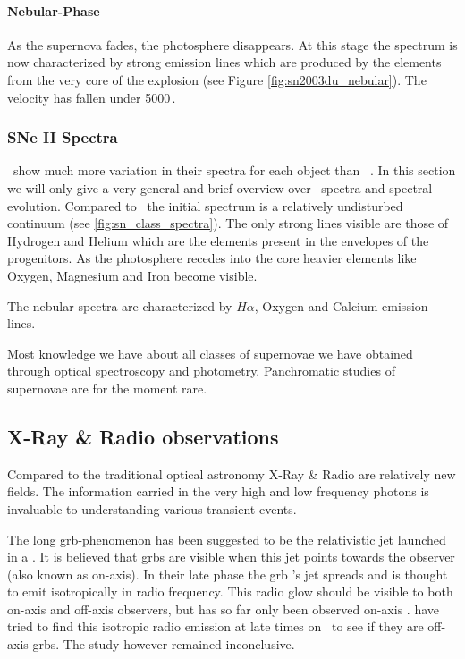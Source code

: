 \paragraph{Nebular-Phase}
As the supernova fades, the photosphere disappears. At this stage the spectrum is now characterized by strong emission lines which are produced by the elements from the very core of the explosion (see Figure \ref{fig:sn2003du_nebular}). The velocity has fallen under 5000\,\kms. 




\subsubsection{SNe II Spectra}
\sneii\ show much more variation in their spectra for each object than \sneia\ . In this section we will only give a very general and brief overview over \sneii\ spectra and spectral evolution. 
Compared to \sneia\ the initial spectrum is a relatively undisturbed continuum (see \ref{fig:sn_class_spectra}). The only strong lines visible are those of Hydrogen and Helium which are the elements present in the envelopes of the progenitors. 
As the photosphere recedes into the core heavier elements like Oxygen, Magnesium and Iron become visible. 

The nebular spectra are characterized by $H\alpha$, Oxygen and Calcium emission lines. 

Most knowledge we have about all classes of supernovae we have obtained through optical spectroscopy and photometry. Panchromatic studies of supernovae are for the moment rare.

\subsection{X-Ray \& Radio observations}

Compared to the traditional optical astronomy X-Ray \& Radio are relatively new fields. The information carried in the very high and low frequency photons is invaluable to understanding various transient events. 

The long \gls{grb}-phenomenon has been suggested to be the relativistic jet launched in a \snibc. It is believed that \glspl{grb} are visible when this jet points towards the observer (also known as on-axis). In their late phase the \gls{grb} 's jet spreads and is thought to emit isotropically in radio frequency. This radio glow should be visible to both on-axis and off-axis observers, but has so far only been observed on-axis . \cite{2006ApJ...638..930S} have tried to find this isotropic radio emission at late times on \snibc\ to see if they are off-axis \glspl{grb}. The study however remained inconclusive.

